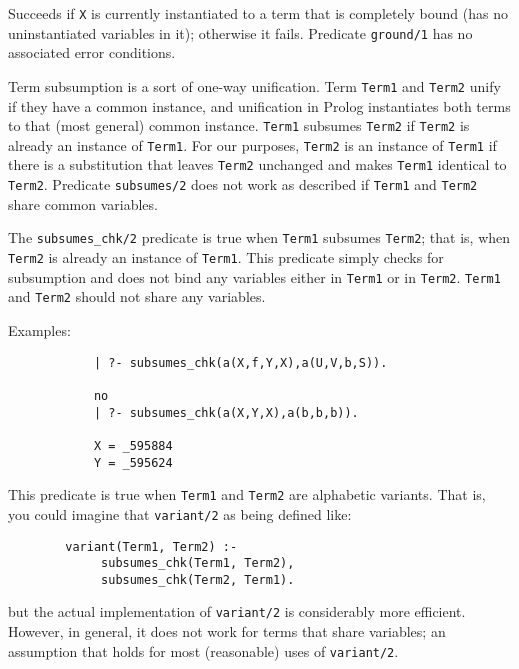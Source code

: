 \begin{description}
    Succeeds if {\tt X} is currently instantiated to a term that is 
    completely bound (has no uninstantiated variables in it); 
    otherwise it fails.  Predicate {\tt ground/1} has no associated 
    error conditions.

    Term subsumption is a sort of one-way unification.  Term {\tt Term1}
    and {\tt Term2} unify if they have a common instance, and unification
    in Prolog instantiates both terms to that (most general) common instance.
    {\tt Term1} subsumes {\tt Term2} if {\tt Term2} is already an instance of
    {\tt Term1}.  For our purposes, {\tt Term2} is an instance of {\tt Term1}
    if there is a substitution that leaves {\tt Term2} unchanged and makes
    {\tt Term1} identical to {\tt Term2}.  Predicate {\tt subsumes/2} does
    not work as described if {\tt Term1} and {\tt Term2} share common
    variables.

    The {\tt subsumes\_chk/2} predicate is true when {\tt Term1} subsumes 
    {\tt Term2}; that is, when {\tt Term2} is already an instance of
    {\tt Term1}.  This predicate simply checks for subsumption and 
    does not bind any variables either in {\tt Term1} or in {\tt Term2}.
    {\tt Term1} and {\tt Term2} should not share any variables.

    Examples:
    {\footnotesize
     \begin{verbatim}
            | ?- subsumes_chk(a(X,f,Y,X),a(U,V,b,S)).

            no
            | ?- subsumes_chk(a(X,Y,X),a(b,b,b)).

            X = _595884
            Y = _595624
     \end{verbatim}}

    This predicate is true when {\tt Term1} and {\tt Term2} are 
    alphabetic variants.  That is, you could imagine that {\tt variant/2}
    as being defined like:
    \begin{center}
    \begin{minipage}{3.5in}
    \begin{verbatim}
        variant(Term1, Term2) :-
             subsumes_chk(Term1, Term2),
             subsumes_chk(Term2, Term1).
    \end{verbatim}
    \end{minipage}
    \end{center}
    but the actual implementation of {\tt variant/2} is considerably more
    efficient.  However, in general, it does not work for terms that share
    variables; an assumption that holds for most (reasonable) uses of
    {\tt variant/2}.

\end{description}

